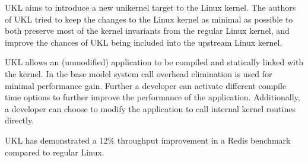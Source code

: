 \documentclass[10pt,twocolumn,a4paper]{article}
\begin{document}
  UKL aims to introduce a new unikernel target to the Linux kernel.
  The authors of UKL tried to keep the changes to the Linux kernel as minimal as possible
  to both preserve most of the kernel invariants from the regular Linux kernel, and
  improve the chances of UKL being included into the upstream Linux kernel.

  UKL allows an (unmodified) application to be compiled and statically linked with the kernel.
  In the base model system call overhead elimination is used for minimal performance gain.
  Further a developer can activate different compile time options to further improve the performance
  of the application.
  Additionally, a developer can choose to modify the application to call internal kernel routines directly.

  UKL has demonstrated a 12\% throughput improvement in a Redis benchmark compared to regular Linux.
  



\end{document}
